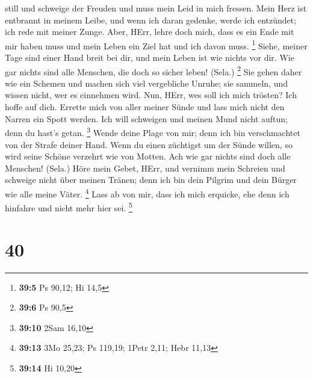 still und schweige der Freuden und muss mein Leid in mich fressen.
 Mein Herz ist entbrannt in meinem Leibe, und wenn ich daran
gedenke, werde ich entzündet; ich rede mit meiner Zunge. 
Aber, HErr, lehre doch mich, dass es ein Ende mit mir haben muss und
mein Leben ein Ziel hat und ich davon muss. \footnote{\textbf{39:5} Ps
  90,12; Hi 14,5}  Siehe, meiner Tage sind einer Hand breit
bei dir, und mein Leben ist wie nichts vor dir. Wie gar nichts sind alle
Menschen, die doch so sicher leben! (Sela.) \footnote{\textbf{39:6} Ps
  90,5}  Sie gehen daher wie ein Schemen und machen sich
viel vergebliche Unruhe; sie sammeln, und wissen nicht, wer es einnehmen
wird.  Nun, HErr, wes soll ich mich trösten? Ich hoffe auf
dich.  Errette mich von aller meiner Sünde und lass mich
nicht den Narren ein Spott werden.  Ich will schweigen und
meinen Mund nicht auftun; denn du hast's getan. \footnote{\textbf{39:10}
  2Sam 16,10}  Wende deine Plage von mir; denn ich bin
verschmachtet von der Strafe deiner Hand.  Wenn du einen
züchtigst um der Sünde willen, so wird seine Schöne verzehrt wie von
Motten. Ach wie gar nichts sind doch alle Menschen! (Sela.)
 Höre mein Gebet, HErr, und vernimm mein Schreien und
schweige nicht über meinen Tränen; denn ich bin dein Pilgrim und dein
Bürger wie alle meine Väter. \footnote{\textbf{39:13} 3Mo 25,23; Ps
  119,19; 1Petr 2,11; Hebr 11,13}  Lass ab von mir, dass
ich mich erquicke, ehe denn ich hinfahre und nicht mehr hier sei.
\footnote{\textbf{39:14} Hi 10,20}

\hypertarget{section-17}{%
\section{40}\label{section-17}}

